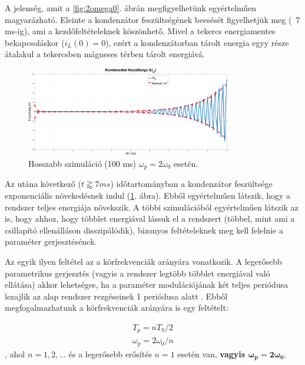 \documentclass[12pt,a4paper]{article}
\begin{document}
A jelenség, amit a \ref{fig:2omega0}. ábrán megfigyelhetünk egyértelműen magyarázható. Eleinte a kondenzátor feszültségének
beesését figyelhetjük meg (~7 ms-ig), ami a kezdőfeltételeknek köszönhető. Mivel a tekercs energiamentes bekapcsoláskor ($i_L(0) = 0$),
ezért a kondenzátorban tárolt energia egyy része átalakul a tekercsben mágneses térben tárolt energiává.

\begin{figure}[H]
    \centering
    \includegraphics[width=0.8\textwidth]{figures/envelope.png}
    \caption{Hosszabb szimuláció (100 ms) $\omega_p = 2\omega_0$ esetén.}
    \label{fig:envelope}
\end{figure}

Az utána következő ($t \gtrapprox 7 ms$) időtartományban a kondenzátor feszültsége exponenciális növekedésnek indul (\ref{fig:envelope}. ábra). Ebből egyértelműen
látszik, hogy a rendszer teljes energiája növekszik. A többi szimulációból egyértelműen látszik az is, hogy ahhoz, hogy többlet energiával lássuk el a rendszert (többel, mint ami
a csillapító ellenálláson disszipálódik), bizonyos feltételeknek meg kell felelnie a paraméter gerjesztésének.

Az egyik ilyen feltétel az a körfrekvenciák arányára vonatkozik. A legerősebb parametrikus gerjesztés (vagyis a rendszer legtöbb többlet energiával való ellátása) akkor lehetséges,
ha a paraméter modulációjának két teljes periódusa lezajlik az alap rendszer rezgéseinek 1 periódusa alatt \cite{butikov2004parametric}. Ebből megfogalmazhatunk a körfrekvenciák arányára is egy feltételt:

\begin{equation}
    \boxed
    {
        \begin{split}
                T_p = nT_0/2 \\
                \omega_p = 2\omega_0/n
        \end{split}
    }
    \label{avlna}
\end{equation}
, ahol $n = 1, 2, \dots$ és a legerősebb erősítés $n = 1$ esetén van, \textbf{vagyis $\boldsymbol{\omega_p = 2\omega_0}$}.
\end{document}
